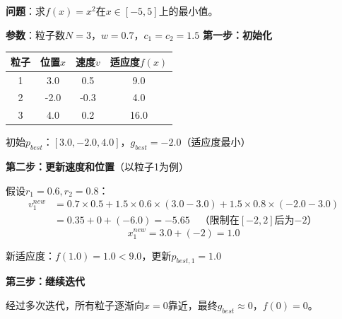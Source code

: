 \begin{examplebox}[例题4.3 用PSO求函数最小值]
\textbf{问题}：求$f(x) = x^2$在$x \in [-5, 5]$上的最小值。

\textbf{参数}：粒子数$N=3$，$w=0.7$，$c_1=c_2=1.5$
\tcblower
\textbf{第一步：初始化}
\begin{center}
\begin{tabular}{cccc}
\toprule
粒子 & 位置$x$ & 速度$v$ & 适应度$f(x)$ \\
\midrule
1 & 3.0 & 0.5 & 9.0 \\
2 & -2.0 & -0.3 & 4.0 \\
3 & 4.0 & 0.2 & 16.0 \\
\bottomrule
\end{tabular}
\end{center}

初始$p_{best}$：$[3.0, -2.0, 4.0]$，$g_{best} = -2.0$（适应度最小）

\textbf{第二步：更新速度和位置}（以粒子1为例）

假设$r_1=0.6, r_2=0.8$：
\begin{align*}
v_1^{new} &= 0.7 \times 0.5 + 1.5 \times 0.6 \times (3.0-3.0) + 1.5 \times 0.8 \times (-2.0-3.0) \\
&= 0.35 + 0 + (-6.0) = -5.65 \quad \text{（限制在$[-2,2]$后为$-2$）}
\end{align*}
$$x_1^{new} = 3.0 + (-2) = 1.0$$

新适应度：$f(1.0) = 1.0 < 9.0$，更新$p_{best,1} = 1.0$

\textbf{第三步：继续迭代}

经过多次迭代，所有粒子逐渐向$x=0$靠近，最终$g_{best} \approx 0$，$f(0)=0$。
\end{examplebox}

